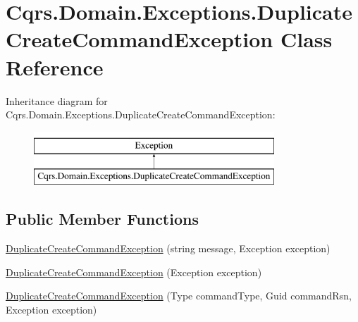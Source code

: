 \hypertarget{classCqrs_1_1Domain_1_1Exceptions_1_1DuplicateCreateCommandException}{}\section{Cqrs.\+Domain.\+Exceptions.\+Duplicate\+Create\+Command\+Exception Class Reference}
\label{classCqrs_1_1Domain_1_1Exceptions_1_1DuplicateCreateCommandException}
Inheritance diagram for Cqrs.\+Domain.\+Exceptions.\+Duplicate\+Create\+Command\+Exception\+:\begin{figure}[H]
\begin{center}
\leavevmode
\includegraphics[height=2.000000cm]{classCqrs_1_1Domain_1_1Exceptions_1_1DuplicateCreateCommandException}
\end{center}
\end{figure}
\subsection*{Public Member Functions}
\begin{DoxyCompactItemize}
\item 
\hyperlink{classCqrs_1_1Domain_1_1Exceptions_1_1DuplicateCreateCommandException_a0e8200ecbb5356dcb91eff89c7376784_a0e8200ecbb5356dcb91eff89c7376784}{Duplicate\+Create\+Command\+Exception} (string message, Exception exception)
\item 
\hyperlink{classCqrs_1_1Domain_1_1Exceptions_1_1DuplicateCreateCommandException_af7b3528197bfb3e1b1b67ac286268913_af7b3528197bfb3e1b1b67ac286268913}{Duplicate\+Create\+Command\+Exception} (Exception exception)
\item 
\hyperlink{classCqrs_1_1Domain_1_1Exceptions_1_1DuplicateCreateCommandException_a1e128e58b355384c3db1d0b1fbbe411a_a1e128e58b355384c3db1d0b1fbbe411a}{Duplicate\+Create\+Command\+Exception} (Type command\+Type, Guid command\+Rsn, Exception exception)
\end{DoxyCompactItemize}


